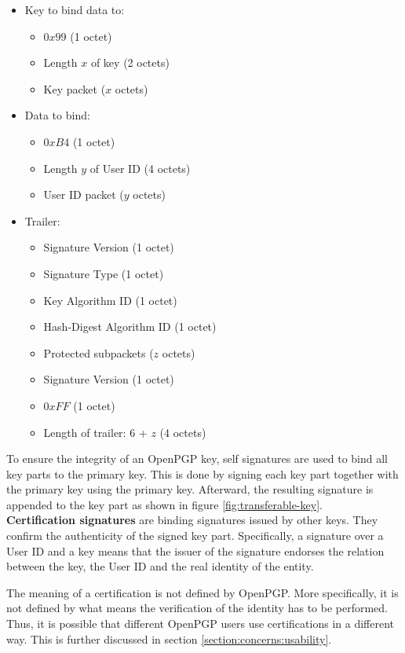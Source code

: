\begin{itemize} \label{listing:signature}
	\item Key to bind data to:
	\begin{itemize}
		\item $0x99$ (1 octet)
		\item Length $x$ of key (2 octets)
		\item Key packet ($x$ octets)
	\end{itemize}
	
	\item Data to bind:
	\begin{itemize}
		\item $0xB4$ (1 octet)
		\item Length $y$ of User ID (4 octets)
		\item User ID packet ($y$ octets)
	\end{itemize}
	
	\item Trailer:
	\begin{itemize}
		\item Signature Version (1 octet)
		\item Signature Type (1 octet)
		\item Key Algorithm ID (1 octet)
		\item Hash-Digest Algorithm ID (1 octet)
		\item Protected subpackets ($z$ octets)
		\item Signature Version (1 octet) 
		\item $0xFF$ (1 octet)
		\item Length of trailer: 6 + $z$ (4 octets)
	\end{itemize}
\end{itemize}

To ensure the integrity of an OpenPGP key, self signatures are used to bind all key parts to the primary key. This is done by signing each key part together with the primary key using the primary key. Afterward, the resulting signature is appended to the key part as shown in figure \ref{fig:transferable-key}. \\

\textbf{Certification signatures} are binding signatures issued by other keys. They confirm the authenticity of the signed key part. Specifically, a signature over a User ID and a key means that the issuer of the signature endorses the relation between the key, the User ID and the real identity of the entity.

The meaning of a certification is not defined by OpenPGP. More specifically, it is not defined by what means the verification of the identity has to be performed. Thus, it is possible that different OpenPGP users use certifications in a different way. This is further discussed in section \ref{section:concerns:usability}. \\

